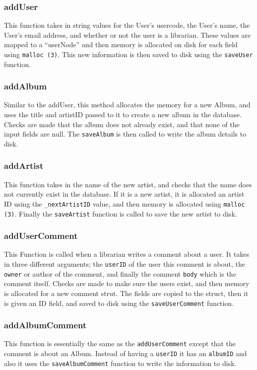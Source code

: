 \documentclass{article}
\begin{document}
\subsubsection*{addUser}
This function takes in string values for the User's usercode, the User's name, the User's email address, and whether or not the user is a librarian.  These values are mapped to a ``userNode'' and then memory is allocated on disk for each field using \verb|malloc (3)|. This new information is then saved to disk using the \verb|saveUser| function.

\subsubsection*{addAlbum}
Similar to the addUser, this method allocates the memory for a new Album, and uses the title and artistID passed to it to create a new album in the database. Checks are made that the album does not already exist, and that none of the input fields are null. The \verb|saveAlbum| is then called to write the album details to disk.

\subsubsection*{addArtist}
This function takes in the name of the new artist, and checks that the name does not currently exist in the database. If it is a new artist, it is allocated an artist ID using the \verb|_nextArtistID| value, and then memory is allocated using \verb|malloc (3)|. Finally the \verb|saveArtist| function is called to save the new artist to disk.

\subsubsection*{addUserComment}
This Function is called when a librarian writes a comment about a user. It takes in three different arguments; the \verb|userID| of the user this comment is about, the \verb|owner| or author of the comment, and finally the comment \verb|body| which is the comment itself. Checks are made to make sure the users exist, and then memory is allocated for a new comment strut. The fields are copied to the struct, then it is given an ID field, and saved to disk using the \verb|saveUserComment| function.

\subsubsection*{addAlbumComment}
This function is essentially the same as the \verb|addUserComment| except that the comment is about an Album. Instead of having a \verb|userID| it has an \verb|albumID| and also it uses the \verb|saveAlbumComment| function to write the information to disk.
\end{document}
